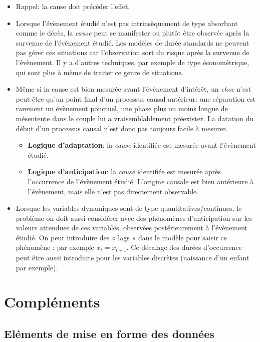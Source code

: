 \documentclass[
  12pt,
  letterpaper,
  DIV=11,
  numbers=noendperiod,
  onepage,
  openany]{scrreprt}
\providecommand{\tightlist}{%
  \setlength{\itemsep}{0pt}\setlength{\parskip}{0pt}}\usepackage{longtable,booktabs,array}
\begin{document}
\begin{itemize}
\item
  Rappel: la cause doit précèder l'effet.
\item
  Lorsque l'évènement étudié n'est pas intrinsèquement de type absorbant
  comme le décès, la \emph{cause} peut se manifester ou plutôt être
  observée après la survenue de l'évènement étudié. Les modèles de durée
  standards ne peuvent pas gérer ces situations car l'observation sort
  du risque après la survenue de l'évènement. Il y a d'autres
  techniques, par exemple de type économétrique, qui sont plus à même de
  traiter ce genre de situations.
\item
  Même si la cause est bien mesurée avant l'évènement d'intérêt, un
  \emph{choc} n'est peut-être qu'un point final d'un processus causal
  antérieur: une séparation est rarement un évènement ponctuel, une
  phase plus ou moins longue de mésentente dans le couple lui a
  vraisemblablement préexister. La datation du début d'un processus
  causal n'est donc pas toujours facile à mesurer.

  \begin{itemize}
  \tightlist
  \item
    \textbf{Logique d'adaptation}: la \emph{cause} identifiée est
    mesurée avant l'évènement étudié.
  \item
    \textbf{Logique d'anticipation}: la \emph{cause} identifiée est
    mesurée après l'occurrence de l'évènement étudié. L'origine causale
    est bien antérieure à l'évènement, mais elle n'est pas directement
    observable.
  \end{itemize}
\item
  Lorsque les variables dynamiques sont de type quantitatives/continues,
  le problème on doit aussi considérer avec des phénomènes
  d'anticipation sur les valeurs attendues de ces variables, observées
  postérieurement à l'évènement étudié. On peut introduire des « lags »
  dans le modèle pour saisir ce phénomène : par exemple
  \(x_t= x_{t+1}\). Ce décalage des durées d'occurrence peut être aussi
  introduite pour les variables discrètes (naissance d'un enfant par
  exemple).
\end{itemize}

\part{Compléments}

\hypertarget{eluxe9ments-de-mise-en-forme-des-donnuxe9es}{%
\chapter{Eléments de mise en forme des
données}\label{eluxe9ments-de-mise-en-forme-des-donnuxe9es}}
\end{document}
